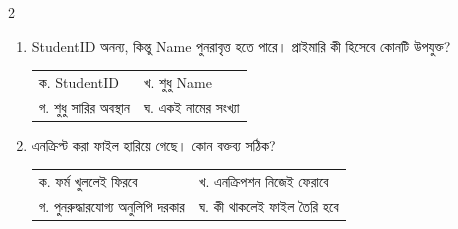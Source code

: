 \begin{multicols}{2}
\begin{enumerate}[resume]
\item \begin{minipage}[t]{\linewidth}
StudentID অনন্য, কিন্তু Name পুনরাবৃত্ত হতে পারে। প্রাইমারি কী হিসেবে কোনটি উপযুক্ত?
\par
\begin{tabularx}{\linewidth}{@{}X X@{}}
ক. StudentID & খ. শুধু Name \\
গ. শুধু সারির অবস্থান & ঘ. একই নামের সংখ্যা \\
\end{tabularx}
\end{minipage}
\vspace{1pt}

\item \begin{minipage}[t]{\linewidth}
এনক্রিপ্ট করা ফাইল হারিয়ে গেছে। কোন বক্তব্য সঠিক?
\par
\begin{tabularx}{\linewidth}{@{}X X@{}}
ক. ফর্ম খুললেই ফিরবে & খ. এনক্রিপশন নিজেই ফেরাবে \\
গ. পুনরুদ্ধারযোগ্য অনুলিপি দরকার & ঘ. কী থাকলেই ফাইল তৈরি হবে \\
\end{tabularx}
\end{minipage}
\vspace{1pt}

\end{enumerate}

\end{multicols}
